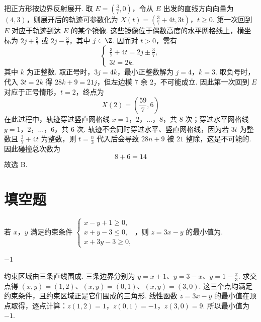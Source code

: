 \begin{solution}
把正方形按边界反射展开. 取 \(E=\left(\frac37,0\right)\)，令从 \(E\) 出发的直线方向向量为 \((4,3)\)，则展开后的轨迹可参数化为
\(X(t)=\left(\frac37+4t,3t\right)\)，\(t\geqslant0\).
第一次回到 \(E\) 对应于轨迹到达 \(E\) 的某个镜像. 这些镜像位于偶数高度的水平网格线上，横坐标为 \(2j+\frac37\) 或 \(2j-\frac37\)，其中 \(j\in\Z\). 因而对 \(t>0\)，需有
\[
\begin{cases}
\frac37+4t=2j\mathbin{\pm}\frac37,\\
3t=2k.
\end{cases}
\]
其中 \(k\) 为正整数. 取正号时，\(3j=4k\)，最小正整数解为 \(j=4\)，\(k=3\). 取负号时，代入 \(3t=2k\) 得 \(28k+9=21j\)，但左边模 \(7\) 余 \(2\)，不可能成立. 因此第一次回到 \(E\) 对应于正号情形，\(t=2\)，终点为
\[
X(2)=\left(\frac{59}{7},6\right)
\]
在此过程中，轨迹穿过竖直网格线 \(x=1\)，\(2\)，\(\ldots\)，\(8\)，共 \(8\) 次；穿过水平网格线 \(y=1\)，\(2\)，\(\ldots\)，\(6\)，共 \(6\) 次. 轨迹不会同时穿过水平、竖直网格线，因为若 \(3t\) 为整数且 \(\frac{3}{7}+4t\) 为整数，则 \(t=\frac{n}{3}\) 代入后会导致 \(28n+9\) 被 \(21\) 整除，这是不可能的. 因此碰撞总次数为
\[
8+6=14
\]
故选 B.
\end{solution}

\section{填空题}

\begin{problem}
若 \(x\)，\(y\) 满足约束条件 \(\begin{cases}
x - y + 1 \geqslant 0,\\
x + y - 3 \leqslant 0,\\
x + 3y - 3 \geqslant 0,
\end{cases}\)，则 \(z = 3x - y\) 的最小值为\fillinblank{}.
\end{problem}

\begin{answer}
\(-1\)
\end{answer}

\begin{solution}
约束区域由三条直线围成. 三条边界分别为 \(y=x+1\)、\(y=3-x\)、\(y=1-\frac{x}{3}\).
求交点得 \((x,y)=(1,2)\)、\((x,y)=(0,1)\)、\((x,y)=(3,0)\).
这三个点均满足约束条件，且约束区域正是它们围成的三角形.
线性函数 \(z=3x-y\) 的最小值在顶点取得，逐点计算：\(z(1,2)=1\)，\(z(0,1)=-1\)，\(z(3,0)=9\).
所以最小值为 \(-1\).
\end{solution}

